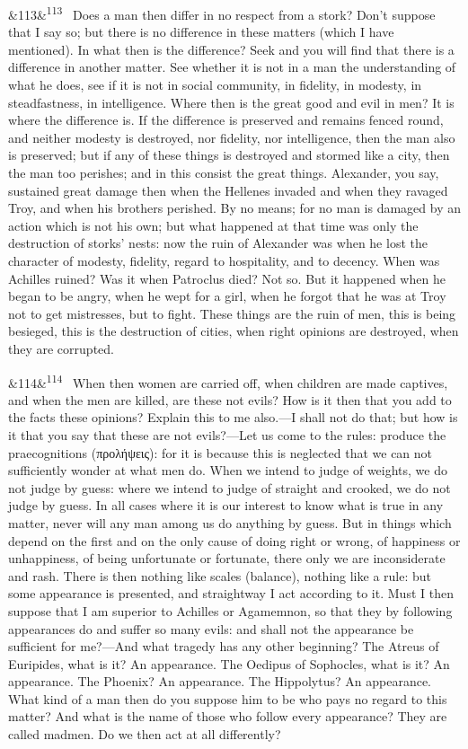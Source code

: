 \documentclass[12pt]{article}
\newcommand{\para}[1][]{\par\noindent\ifx&#1&\else\textsuperscript{\footnotesize #1}~\fi}
\begin{document}
\para[113] Does a man then differ in no respect from a stork? Don't suppose that I say so; but there is no difference in these matters (which I have mentioned). In what then is the difference? Seek and you will find that there is a difference in another matter. See whether it is not in a man the understanding of what he does, see if it is not in social community, in fidelity, in modesty, in steadfastness, in intelligence. Where then is the great good and evil in men? It is where the difference is. If the difference is preserved and remains fenced round, and neither modesty is destroyed, nor fidelity, nor intelligence, then the man also is preserved; but if any of these things is destroyed and stormed like a city, then the man too perishes; and in this consist the great things. Alexander, you say, sustained great damage then when the Hellenes invaded and when they ravaged Troy, and when his brothers perished. By no means; for no man is damaged by an action which is not his own; but what happened at that time was only the destruction of storks' nests: now the ruin of Alexander was when he lost the character of modesty, fidelity, regard to hospitality, and to decency. When was Achilles ruined? Was it when Patroclus died? Not so. But it happened when he began to be angry, when he wept for a girl, when he forgot that he was at Troy not to get mistresses, but to fight. These things are the ruin of men, this is being besieged, this is the destruction of cities, when right opinions are destroyed, when they are corrupted.

\para[114] When then women are carried off, when children are made captives, and when the men are killed, are these not evils? How is it then that you add to the facts these opinions? Explain this to me also.—I shall not do that; but how is it that you say that these are not evils?—Let us come to the rules: produce the praecognitions (προλήψεις): for it is because this is neglected that we can not sufficiently wonder at what men do. When we intend to judge of weights, we do not judge by guess: where we intend to judge of straight and crooked, we do not judge by guess. In all cases where it is our interest to know what is true in any matter, never will any man among us do anything by guess. But in things which depend on the first and on the only cause of doing right or wrong, of happiness or unhappiness, of being unfortunate or fortunate, there only we are inconsiderate and rash. There is then nothing like scales (balance), nothing like a rule: but some appearance is presented, and straightway I act according to it. Must I then suppose that I am superior to Achilles or Agamemnon, so that they by following appearances do and suffer so many evils: and shall not the appearance be sufficient for me?—And what tragedy has any other beginning? The Atreus of Euripides, what is it? An appearance. The Oedipus of Sophocles, what is it? An appearance. The Phoenix? An appearance. The Hippolytus? An appearance. What kind of a man then do you suppose him to be who pays no regard to this matter? And what is the name of those who follow every appearance? They are called madmen. Do we then act at all differently?
\end{document}
